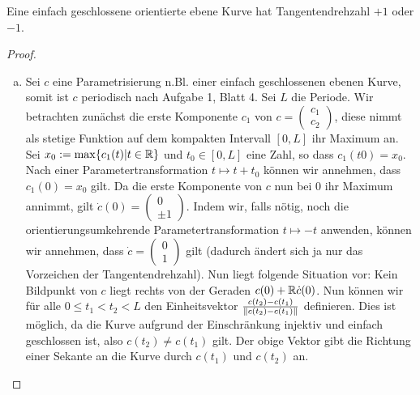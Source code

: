 \documentclass[11pt]{scrbook}
\begin{document}
\begin{st}[Umlaufsatz]
\label{4.8}
Eine einfach geschlossene orientierte ebene Kurve hat Tangentendrehzahl $+1$ oder $-1$.

\begin{proof}
\begin{enumerate}[a)]
	\item
		Sei $c$ eine Parametrisierung n.Bl. einer einfach geschlossenen ebenen Kurve, somit ist $c$ periodisch nach Aufgabe 1, Blatt 4. Sei $L$ die Periode. Wir betrachten zunächst die erste Komponente $c_1$ von $c = \begin{pmatrix} c_1 \\ c_2 \end{pmatrix}$, diese nimmt als stetige Funktion auf dem kompakten Intervall $[0, L]$ ihr Maximum an. Sei $x_0 := \max \{ c_1(t) | t \in \mathbb{R} \}$ und $t_0 \in [0, L]$ eine Zahl, so dass $c_1(t0) = x_0$. Nach einer Parametertransformation $t \mapsto t + t_0$ können wir annehmen, dass $c_1(0) = x_0$ gilt. Da die erste Komponente von $c$ nun bei $0$ ihr Maximum annimmt, gilt $\dot c(0) = \begin{pmatrix} 0 \\ \pm 1 \end{pmatrix}$. Indem wir, falls nötig, noch die orientierungsumkehrende Parametertransformation $t \mapsto -t$ anwenden, können wir annehmen, dass $\dot c = \begin{pmatrix} 0 \\ 1 \end{pmatrix}$ gilt (dadurch ändert sich ja nur das Vorzeichen der Tangentendrehzahl). Nun liegt folgende Situation vor: Kein Bildpunkt von $c$ liegt rechts von der Geraden $c(0) + \mathbb{R} \dot c(0)$. Nun können wir für alle $0 \leq t_1 < t_2 < L$ den Einheitsvektor $\frac{c(t_2) - c(t_1)}{\| c(t_2) - c(t_1) \|}$ definieren. Dies ist möglich, da die Kurve aufgrund der Einschränkung injektiv und einfach geschlossen ist, also $c(t_2) \neq c(t_1)$ gilt. Der obige Vektor gibt die Richtung einer Sekante an die Kurve durch $c(t_1)$ und $c(t_2)$ an.


\end{enumerate}
\end{proof}
\end{st}
\end{document}
